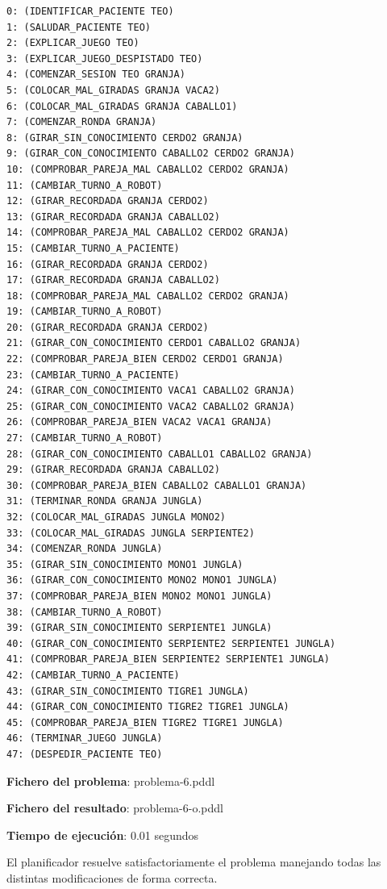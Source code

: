 \documentclass{uc3mpracticas}
\begin{document}
    \begin{lstlisting}
0: (IDENTIFICAR_PACIENTE TEO)
1: (SALUDAR_PACIENTE TEO)
2: (EXPLICAR_JUEGO TEO)
3: (EXPLICAR_JUEGO_DESPISTADO TEO)
4: (COMENZAR_SESION TEO GRANJA)
5: (COLOCAR_MAL_GIRADAS GRANJA VACA2)
6: (COLOCAR_MAL_GIRADAS GRANJA CABALLO1)
7: (COMENZAR_RONDA GRANJA)
8: (GIRAR_SIN_CONOCIMIENTO CERDO2 GRANJA)
9: (GIRAR_CON_CONOCIMIENTO CABALLO2 CERDO2 GRANJA)
10: (COMPROBAR_PAREJA_MAL CABALLO2 CERDO2 GRANJA)
11: (CAMBIAR_TURNO_A_ROBOT)
12: (GIRAR_RECORDADA GRANJA CERDO2)
13: (GIRAR_RECORDADA GRANJA CABALLO2)
14: (COMPROBAR_PAREJA_MAL CABALLO2 CERDO2 GRANJA)
15: (CAMBIAR_TURNO_A_PACIENTE)
16: (GIRAR_RECORDADA GRANJA CERDO2)
17: (GIRAR_RECORDADA GRANJA CABALLO2)
18: (COMPROBAR_PAREJA_MAL CABALLO2 CERDO2 GRANJA)
19: (CAMBIAR_TURNO_A_ROBOT)
20: (GIRAR_RECORDADA GRANJA CERDO2)
21: (GIRAR_CON_CONOCIMIENTO CERDO1 CABALLO2 GRANJA)
22: (COMPROBAR_PAREJA_BIEN CERDO2 CERDO1 GRANJA)
23: (CAMBIAR_TURNO_A_PACIENTE)
24: (GIRAR_CON_CONOCIMIENTO VACA1 CABALLO2 GRANJA)
25: (GIRAR_CON_CONOCIMIENTO VACA2 CABALLO2 GRANJA)
26: (COMPROBAR_PAREJA_BIEN VACA2 VACA1 GRANJA)
27: (CAMBIAR_TURNO_A_ROBOT)
28: (GIRAR_CON_CONOCIMIENTO CABALLO1 CABALLO2 GRANJA)
29: (GIRAR_RECORDADA GRANJA CABALLO2)
30: (COMPROBAR_PAREJA_BIEN CABALLO2 CABALLO1 GRANJA)
31: (TERMINAR_RONDA GRANJA JUNGLA)
32: (COLOCAR_MAL_GIRADAS JUNGLA MONO2)
33: (COLOCAR_MAL_GIRADAS JUNGLA SERPIENTE2)
34: (COMENZAR_RONDA JUNGLA)
35: (GIRAR_SIN_CONOCIMIENTO MONO1 JUNGLA)
36: (GIRAR_CON_CONOCIMIENTO MONO2 MONO1 JUNGLA)
37: (COMPROBAR_PAREJA_BIEN MONO2 MONO1 JUNGLA)
38: (CAMBIAR_TURNO_A_ROBOT)
39: (GIRAR_SIN_CONOCIMIENTO SERPIENTE1 JUNGLA)
40: (GIRAR_CON_CONOCIMIENTO SERPIENTE2 SERPIENTE1 JUNGLA)
41: (COMPROBAR_PAREJA_BIEN SERPIENTE2 SERPIENTE1 JUNGLA)
42: (CAMBIAR_TURNO_A_PACIENTE)
43: (GIRAR_SIN_CONOCIMIENTO TIGRE1 JUNGLA)
44: (GIRAR_CON_CONOCIMIENTO TIGRE2 TIGRE1 JUNGLA)
45: (COMPROBAR_PAREJA_BIEN TIGRE2 TIGRE1 JUNGLA)
46: (TERMINAR_JUEGO JUNGLA)
47: (DESPEDIR_PACIENTE TEO)

    \end{lstlisting}

    \vspace{2mm}

    \textbf{Fichero del problema}: problema-6.pddl

    \textbf{Fichero del resultado}: problema-6-o.pddl

    \textbf{Tiempo de ejecución}: 0.01 segundos

  \vspace{3mm}

  El planificador resuelve satisfactoriamente el problema manejando todas las distintas modificaciones de forma correcta.
\end{document}

